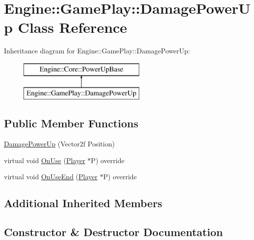 \hypertarget{class_engine_1_1_game_play_1_1_damage_power_up}{}\section{Engine\+:\+:Game\+Play\+:\+:Damage\+Power\+Up Class Reference}
\label{class_engine_1_1_game_play_1_1_damage_power_up}
Inheritance diagram for Engine\+:\+:Game\+Play\+:\+:Damage\+Power\+Up\+:\begin{figure}[H]
\begin{center}
\leavevmode
\includegraphics[height=2.000000cm]{class_engine_1_1_game_play_1_1_damage_power_up}
\end{center}
\end{figure}
\subsection*{Public Member Functions}
\begin{DoxyCompactItemize}
\item 
\hyperlink{class_engine_1_1_game_play_1_1_damage_power_up_a25af42480a9ce9eedbb82e1be666891c}{Damage\+Power\+Up} (Vector2f Position)
\item 
virtual void \hyperlink{class_engine_1_1_game_play_1_1_damage_power_up_abadfb61b67dd580bc98d7e120c2809cd}{On\+Use} (\hyperlink{class_engine_1_1_game_play_1_1_player}{Player} $\ast$P) override
\item 
virtual void \hyperlink{class_engine_1_1_game_play_1_1_damage_power_up_a97bdd448602470ff4305b39eee866fd2}{On\+Use\+End} (\hyperlink{class_engine_1_1_game_play_1_1_player}{Player} $\ast$P) override
\end{DoxyCompactItemize}
\subsection*{Additional Inherited Members}


\subsection{Constructor \& Destructor Documentation}
\mbox{\label{class_engine_1_1_game_play_1_1_damage_power_up_a25af42480a9ce9eedbb82e1be666891c}} 
